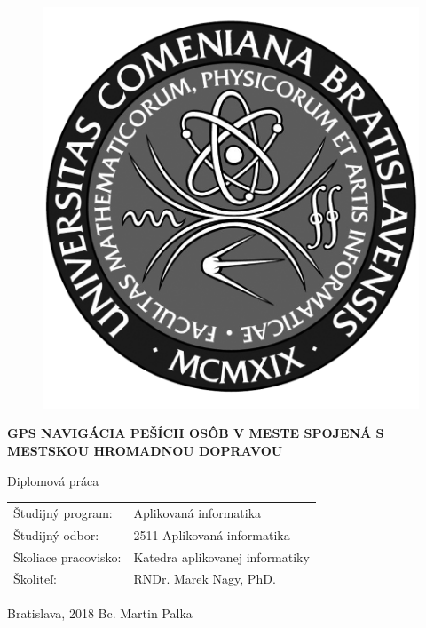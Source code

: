 \documentclass[12pt, a4paper, oneside]{book}
\newcommand\mftitle{GPS navigácia peších osôb v meste
	spojená s mestskou hromadnou
	dopravou}
\newcommand\mfthesistype{Diplomová práca}
\newcommand\mfauthor{Bc. Martin Palka}
\newcommand\mfadvisor{RNDr. Marek Nagy, PhD.}
\newcommand\mfplacedate{Bratislava, 2018}
\begin{document}
\vfill
\begin{figure}[!hbt]
\begin{center}
\includegraphics{images/logo_fmph_dark}
\label{img:logo_dark}
\end{center}
\end{figure}
\begin{center}
\begin{minipage}{0.8\textwidth}
\centerline{\textbf{\Large\MakeUppercase{\mftitle}}}
\smallskip
\centerline{\mfthesistype}
\end{minipage}
\end{center}
\vfill
\begin{tabular}{l l}
Študijný program: & Aplikovaná informatika\\
Študijný odbor: & 2511 Aplikovaná informatika\\
Školiace pracovisko: & Katedra aplikovanej informatiky\\
Školiteľ: & \mfadvisor
\end{tabular}
\vfill
\noindent
\mfplacedate \hfill
\mfauthor
\eject 
\end{document}
